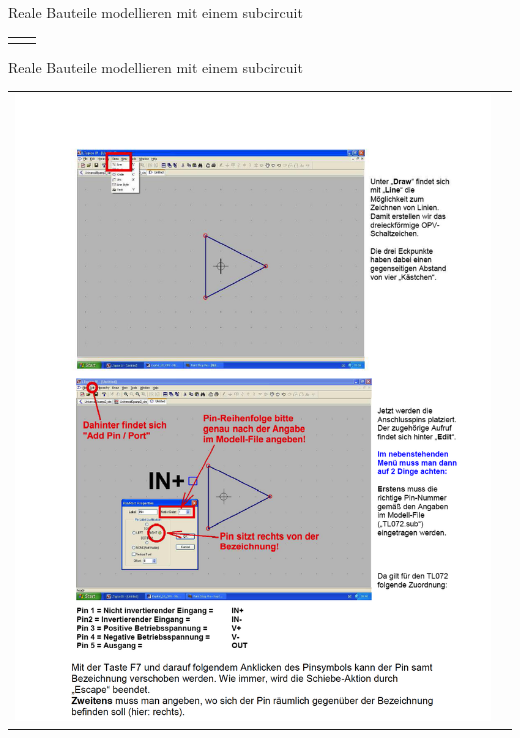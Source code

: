 \begin{frame}[t]{Reale Bauteile modellieren mit einem subcircuit}
\begin{spacing}{0.9}
\begin{tiny}
\begin{table}[h!]
\begin{tabular}{p{5cm} p{5cm}}
\begin{minipage}{0.5\textwidth}
            \end{minipage} 
      \end{tabular}
    \end{table}
    \end{tiny} \end{spacing}
\end{frame}

\begin{frame}[t]{Reale Bauteile modellieren mit einem subcircuit} 
    
    \begin{spacing}{0.9} \begin{tiny}
      \begin{table}[h!]
        \begin{tabular}{p{5cm} p{5cm}}
            \begin{minipage}{0.5\textwidth}                
                \includegraphics[width=\linewidth]{pictures/legacy/tl072_3.png}
            \end{minipage} 

\end{tabular}
\end{table}
\end{tiny}
\end{spacing}
\end{frame}
